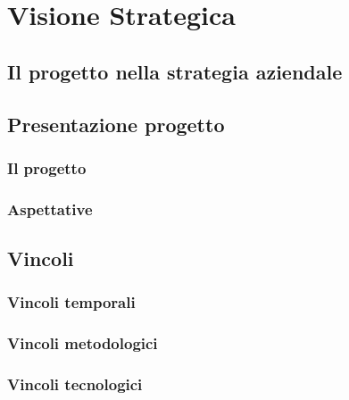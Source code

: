 
\chapter{Visione Strategica}
\label{cap:visione-strategica}



\section{Il progetto nella strategia aziendale}

\section{Presentazione progetto}
\subsection{Il progetto}
\subsection{Aspettative}


\section{Vincoli}
\subsection{Vincoli temporali}
\subsection{Vincoli metodologici}
\subsection{Vincoli tecnologici}
